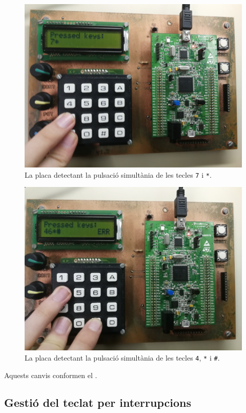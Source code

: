 \begin{figure}[p] %
  \begin{center}
    \includegraphics[width=.82\columnwidth]{../photos/board/c1-keys-two}
  \end{center}
  \caption{ \label{fig:c1-board-keys-two} La placa detectant la pulsació simultània de les tecles \texttt{7} i \texttt{*}. }
\end{figure}
\begin{figure}[p]
  \begin{center}
    \includegraphics[width=.82\columnwidth]{../photos/board/c1-keys-error_2}
  \end{center}
  \caption{ \label{fig:c1-board-keys-error} La placa detectant la pulsació simultània de les tecles \texttt{4}, \texttt{*} i \texttt{\#}. }
\end{figure}

Aquests canvis conformen el .

\subsection{Gestió del teclat per interrupcions}

